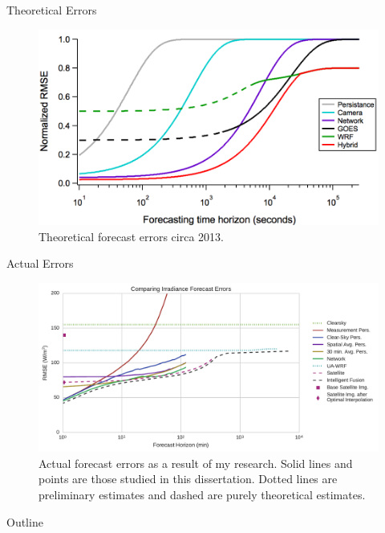 \documentclass[aspectratio=169]{beamer}
\begin{document}
\begin{frame}{Theoretical Errors}
\begin{figure}[h]
  \includegraphics[height=.7\textheight]{figs/original_bullshit.png}
  \caption{Theoretical forecast errors circa 2013.}
\end{figure}
\end{frame}

\begin{frame}{Actual Errors}
\begin{figure}[h]
  \includegraphics[width=.7\textwidth]{../dissertation/figs/timehorizon.pdf}
  \caption{Actual forecast errors as a result of my research. Solid lines
    and points are those studied in this dissertation. Dotted lines are
    preliminary estimates and dashed are purely theoretical estimates.}
\end{figure}
\end{frame}


\begin{frame}{Outline}
  \tableofcontents
\end{frame}
\end{document}
